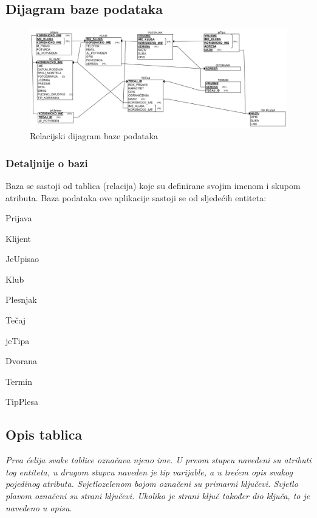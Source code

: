 			\subsection{Dijagram baze podataka}	
		\begin{figure}[H]
			\centering
			\includegraphics[width=\textwidth]{slike/baza.png}
			\caption{Relacijski dijagram baze podataka}
			\label{fig:my_label}
		\end{figure}
	
		
		\subsubsection{ Detaljnije o bazi }
		 Baza se sastoji od tablica (relacija) koje su definirane svojim imenom i skupom atributa. Baza podataka ove aplikacije sastoji se od sljedećih entiteta:
		 	\begin{packed_item}
		 		\item{Prijava}
		 		\item{Klijent}
		 		\item{JeUpisao}
		 		\item{Klub}
		 		\item{Plesnjak}
		 		\item{Tečaj}
		 		\item{jeTipa}
		 		\item{Dvorana}
		 		\item{Termin}
		 		\item{TipPlesa}
		 		
		 		\end{packed_item}
		 
		
		
			\subsection{Opis tablica}
			

				\textit{ Prva ćelija svake tablice označava njeno ime. U prvom stupcu navedeni su atributi tog entiteta, u drugom stupcu naveden je tip varijable, a u trećem opis svakog pojedinog atributa. Svjetlozelenom bojom označeni su primarni ključevi. Svjetlo plavom označeni su strani ključevi. Ukoliko je strani ključ također dio ključa, to je navedeno u opisu.}
				
